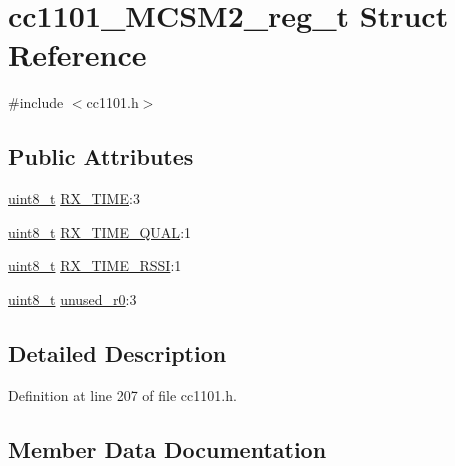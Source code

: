 \hypertarget{structcc1101___m_c_s_m2__reg__t}{}\section{cc1101\+\_\+\+M\+C\+S\+M2\+\_\+reg\+\_\+t Struct Reference}
\label{structcc1101___m_c_s_m2__reg__t}


{\ttfamily \#include $<$cc1101.\+h$>$}

\subsection*{Public Attributes}
\begin{DoxyCompactItemize}
\item 
\hyperlink{_p_e___types_8h_aba7bc1797add20fe3efdf37ced1182c5}{uint8\+\_\+t} \hyperlink{structcc1101___m_c_s_m2__reg__t_afabf6dd26f9b818d7c9aa369dbbe1132}{R\+X\+\_\+\+T\+I\+ME}\+:3
\item 
\hyperlink{_p_e___types_8h_aba7bc1797add20fe3efdf37ced1182c5}{uint8\+\_\+t} \hyperlink{structcc1101___m_c_s_m2__reg__t_af2d45cdc6cf8147c64d76da028dde931}{R\+X\+\_\+\+T\+I\+M\+E\+\_\+\+Q\+U\+AL}\+:1
\item 
\hyperlink{_p_e___types_8h_aba7bc1797add20fe3efdf37ced1182c5}{uint8\+\_\+t} \hyperlink{structcc1101___m_c_s_m2__reg__t_ae9a56d4de0edc27ccd9b969e6b784e9e}{R\+X\+\_\+\+T\+I\+M\+E\+\_\+\+R\+S\+SI}\+:1
\item 
\hyperlink{_p_e___types_8h_aba7bc1797add20fe3efdf37ced1182c5}{uint8\+\_\+t} \hyperlink{structcc1101___m_c_s_m2__reg__t_a1a7698d9696f9cf2d45b6d4246d74034}{unused\+\_\+r0}\+:3
\end{DoxyCompactItemize}


\subsection{Detailed Description}


Definition at line 207 of file cc1101.\+h.



\subsection{Member Data Documentation}
